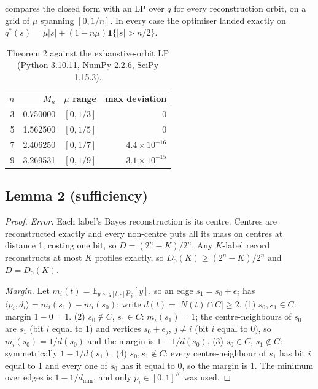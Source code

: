 \documentclass[sigconf,anonymous,acmthm=false]{acmart}
\theoremstyle{acmplain}
\theoremstyle{acmdefinition}
\newcommand{\E}{\mathbb{E}}
\newcommand{\dmin}{d_{\min}}
\begin{document}
 compares the closed form with an LP over $q$ for every reconstruction
orbit, on a grid of $\mu$ spanning $[0,1/n]$. In every case the optimiser landed exactly on
$q^*(s)=\mu|s|+(1-n\mu)\mathbf1\{|s|>n/2\}$.

\begin{table}[h]
\caption{Theorem 2 against the exhaustive-orbit LP (Python 3.10.11, NumPy 2.2.6, SciPy 1.15.3).}
\label{tab:orbit}
\footnotesize
\begin{tabular}{@{}rrlr@{}}
\toprule
$n$ & $M_n$ & $\mu$ range & max deviation\\
\midrule
3 & 0.750000 & $[0,1/3]$ & 0\\
5 & 1.562500 & $[0,1/5]$ & 0\\
7 & 2.406250 & $[0,1/7]$ & $4.4\times10^{-16}$\\
9 & 3.269531 & $[0,1/9]$ & $3.1\times10^{-15}$\\
\bottomrule
\end{tabular}
\end{table}

\subsection{Lemma 2 (sufficiency)}
\begin{proof}
\emph{Error.} Each label's Bayes reconstruction is its centre. Centres are reconstructed
exactly and every non-centre puts all its mass on centres at distance 1, costing one bit, so
$D=(2^n-K)/2^n$. Any $K$-label record reconstructs at most $K$ profiles exactly, so
$D_0(K)\ge(2^n-K)/2^n$ and $D=D_0(K)$.

\emph{Margin.} Let $m_i(t)=\E_{y\sim q[t,\cdot]}p_i[y]$, so an edge $s_1=s_0+e_i$ has
$\langle p_i,d_i\rangle=m_i(s_1)-m_i(s_0)$; write $d(t)=|N(t)\cap C|\ge2$. (1)
$s_0,s_1\in C$: margin $1-0=1$. (2) $s_0\notin C$, $s_1\in C$: $m_i(s_1)=1$; the
centre-neighbours of $s_0$ are $s_1$ (bit $i$ equal to 1) and vertices $s_0+e_j$, $j\ne i$
(bit $i$ equal to 0), so $m_i(s_0)=1/d(s_0)$ and the margin is $1-1/d(s_0)$. (3) $s_0\in C$,
$s_1\notin C$: symmetrically $1-1/d(s_1)$. (4) $s_0,s_1\notin C$: every centre-neighbour of
$s_1$ has bit $i$ equal to 1 and every one of $s_0$ has it equal to 0, so the margin is 1.
The minimum over edges is $1-1/\dmin$, and only $p_i\in[0,1]^K$ was used.
\end{proof}
\end{document}
